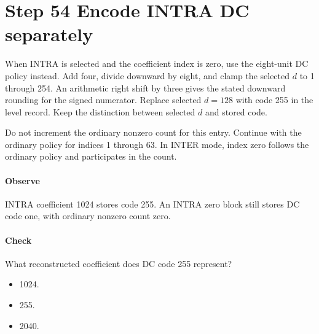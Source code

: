\section{Step 54 Encode INTRA DC separately}\label{h263-quant-s04}
When INTRA is selected and the coefficient index is zero, use the eight-unit DC
policy instead. Add four, divide downward by eight, and clamp the selected $d$
to 1 through 254. An arithmetic right shift by three gives the stated downward
rounding for the signed numerator. Replace selected $d=128$ with code 255 in
the level record. Keep the distinction between selected $d$ and stored code.

Do not increment the ordinary nonzero count for this entry. Continue with the
ordinary policy for indices 1 through 63. In INTER mode, index zero follows the
ordinary policy and participates in the count.

\paragraph{Observe} INTRA coefficient 1024 stores code 255. An INTRA zero
block still stores DC code one, with ordinary nonzero count zero.
\paragraph{Check} What reconstructed coefficient does DC code 255 represent?
\begin{itemize}
  \item[A.] 1024.
  \item[B.] 255.
  \item[C.] 2040.
\end{itemize}
